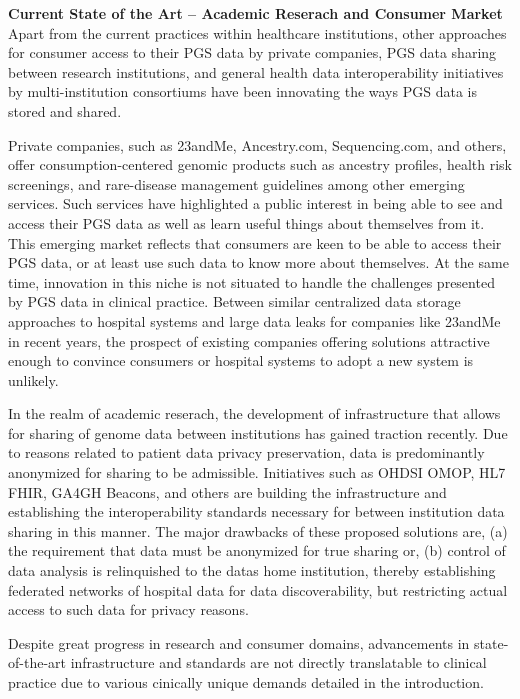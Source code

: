\documentclass[a4paper,11pt]{article}
\begin{document}
\textbf{Current State of the Art -- Academic Reserach and Consumer Market}
Apart from the current practices within healthcare institutions, other approaches for consumer access to their PGS data by private companies, PGS data sharing between research institutions, and general health data interoperability initiatives by multi-institution consortiums have been innovating the ways PGS data is stored and shared. 

Private companies, such as 23andMe, Ancestry.com, Sequencing.com, and others, offer consumption-centered genomic products such as ancestry profiles, health risk screenings, and rare-disease management guidelines among other emerging services. 
Such services have highlighted a public interest in being able to see and access their PGS data as well as learn useful things about themselves from it.
This emerging market reflects that consumers are keen to be able to access their PGS data, or at least use such data to know more about themselves. 
At the same time, innovation in this niche is not situated to handle the challenges presented by PGS data in clinical practice. 
Between similar centralized data storage approaches to hospital systems and large data leaks for companies like 23andMe in recent years, the prospect of existing companies offering solutions attractive enough to convince consumers or hospital systems to adopt a new system is unlikely. 

In the realm of academic reserach, the development of infrastructure that allows for sharing of genome data between institutions has gained traction recently. 
Due to reasons related to patient data privacy preservation, data is predominantly anonymized for sharing to be admissible. 
Initiatives such as OHDSI OMOP, HL7 FHIR, GA4GH Beacons, and others are building the infrastructure and establishing the interoperability standards necessary for between institution data sharing in this manner. 
The major drawbacks of these proposed solutions are, (a) the requirement that data must be anonymized for true sharing or, (b) control of data analysis is relinquished to the data\textquotesingle s home institution, thereby establishing federated networks of hospital data for data discoverability, but restricting actual access to such data for privacy reasons.

Despite great progress in research and consumer domains, advancements in state-of-the-art infrastructure and standards are not directly translatable to clinical practice due to various cinically unique demands detailed in the introduction. 
\end{document}
